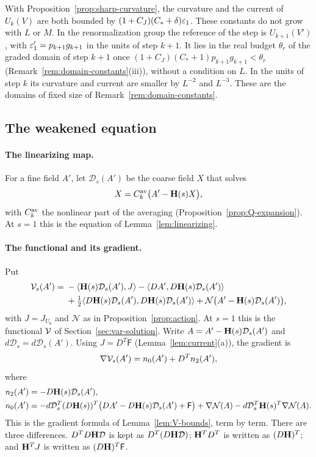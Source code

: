 With Proposition~\ref{prop:sharp-curvature}, the curvature and the current of $U_k(V)$ are both bounded by $(1+C_J)(C_*+\delta)\varepsilon_1$. These constants do not grow with $L$ or $M$. In the renormalization group the reference of the step is $U_{k+1}(V')$, with $\varepsilon'_1=p_{k+1}g_{k+1}$ in the units of step $k+1$. It lies in the real budget $\theta_r$ of the graded domain of step $k+1$ once $(1+C_J)(C_*+1)p_{k+1}g_{k+1}<\theta_r$ (Remark~\ref{rem:domain-constants}(iii)), without a condition on $L$. In the units of step $k$ its curvature and current are smaller by $L^{-2}$ and $L^{-3}$. These are the domains of fixed size of Remark~\ref{rem:domain-constants}.

\subsection{The weakened equation}\label{ss:45.2}

\paragraph{The linearizing map.} For a fine field $A'$, let $\mathcal D_s(A')$ be the coarse field $X$ that solves
\begin{equation}\label{eq:Ds}
X=C^{\rm av}_k\big(A'-\mathbf H(s)X\big),
\end{equation}
with $C^{\rm av}_k$ the nonlinear part of the averaging (Proposition~\ref{prop:Q-expansion}). At $s=1$ this is the equation of Lemma~\ref{lem:linearizing}.

\paragraph{The functional and its gradient.} Put
\[
\begin{aligned}
\mathcal V_s(A')={}&-\langle \mathbf H(s)\mathcal D_s(A'),J\rangle-\langle DA',D\mathbf H(s)\mathcal D_s(A')\rangle\\
&+\tfrac12\langle D\mathbf H(s)\mathcal D_s(A'),D\mathbf H(s)\mathcal D_s(A')\rangle+\mathcal N\big(A'-\mathbf H(s)\mathcal D_s(A')\big),
\end{aligned}
\]
with $J=J_{U_0}$ and $\mathcal N$ as in Proposition~\ref{prop:action}. At $s=1$ this is the functional $\mathcal V$ of Section~\ref{sec:var-solution}. Write $A=A'-\mathbf H(s)\mathcal D_s(A')$ and $d\mathcal D_s=d\mathcal D_s(A')$. Using $J=D^T\mathsf F$ (Lemma~\ref{lem:current}(a)), the gradient is
\begin{equation}\label{eq:gradV-s}
\nabla\mathcal V_s(A')=n_0(A')+D^Tn_2(A'),
\end{equation}
where
\[
\begin{aligned}
n_2(A')&=-D\mathbf H(s)\mathcal D_s(A'),\\
n_0(A')&=-d\mathcal D_s^T(D\mathbf H(s))^T\big(DA'-D\mathbf H(s)\mathcal D_s(A')+\mathsf F\big)+\nabla\mathcal N(A)-d\mathcal D_s^T\mathbf H(s)^T\nabla\mathcal N(A).
\end{aligned}
\]
This is the gradient formula of Lemma~\ref{lem:V-bounds}, term by term. There are three differences. $D^TD\mathbf H\mathcal D$ is kept as $D^T(D\mathbf H\mathcal D)$; $\mathbf H^TD^T$ is written as $(D\mathbf H)^T$; and $\mathbf H^TJ$ is written as $(D\mathbf H)^T\mathsf F$.

